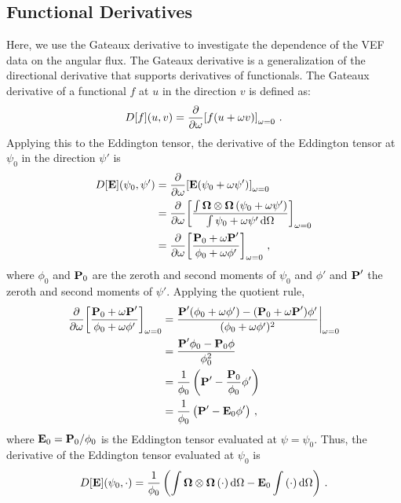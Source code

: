 \documentclass[../doc.tex]{subfiles}
\begin{document}
\subsection{Functional Derivatives}
Here, we use the Gateaux derivative to investigate the dependence of the VEF data on the angular flux. The Gateaux derivative is a generalization of the directional derivative that supports derivatives of functionals. The Gateaux derivative of a functional $f$ at $u$ in the direction $v$ is defined as: 
	\begin{equation}
		D[f](u,v) = \pderiv{}{\omega}\bracket{f(u + \omega v)}_{\omega = 0} \,. 
	\end{equation}
Applying this to the Eddington tensor, the derivative of the Eddington tensor at $\psi_0$ in the direction $\psi'$ is 
	\begin{equation}
	\begin{aligned}
		D[\E](\psi_0,\psi') &= \pderiv{}{\omega} \bracket{\E(\psi_0 + \omega\psi')}_{\omega=0} \\
		&= \pderiv{}{\omega}\bracket{\frac{\int \Omegahat\otimes\Omegahat\paren{\psi_0 + \omega\psi'}}{\int \psi_0 + \omega \psi' \ud \Omega}}_{\omega=0} \\
		&= \pderiv{}{\omega}\bracket{\frac{\P_0 + \omega\P'}{\phi_0 + \omega\phi'}}_{\omega=0} \,,
	\end{aligned}
	\end{equation}
where $\phi_0$ and $\P_0$ are the zeroth and second moments of $\psi_0$ and $\phi'$ and $\P'$ the zeroth and second moments of $\psi'$. Applying the quotient rule, 
	\begin{equation}
	\begin{aligned}
		\pderiv{}{\omega}\bracket{\frac{\P_0 + \omega\P'}{\phi_0 + \omega\phi'}}_{\omega=0} &= \frac{\P'(\phi_0 + \omega \phi') - (\P_0 + \omega\P')\phi'}{(\phi_0 + \omega\phi')^2} \biggr\rvert_{\omega=0} \\
		&= \frac{\P' \phi_0 - \P_0 \phi}{\phi_0^2} \\
		&= \frac{1}{\phi_0}\paren{\P' - \frac{\P_0}{\phi_0} \phi'} \\
		&= \frac{1}{\phi_0}\paren{\P' - \E_0 \phi'} \,, 
	\end{aligned}
	\end{equation}
where $\E_0 = \P_0/\phi_0$ is the Eddington tensor evaluated at $\psi = \psi_0$. 
Thus, the derivative of the Eddington tensor evaluated at $\psi_0$ is 
	\begin{equation}
		D[\E](\psi_0,\cdot) = \frac{1}{\phi_0} \paren{\int \Omegahat\otimes\Omegahat\paren{\cdot}\ud\Omega - \E_0\int \paren{\cdot}\ud \Omega} \,. 
	\end{equation}
\end{document}
